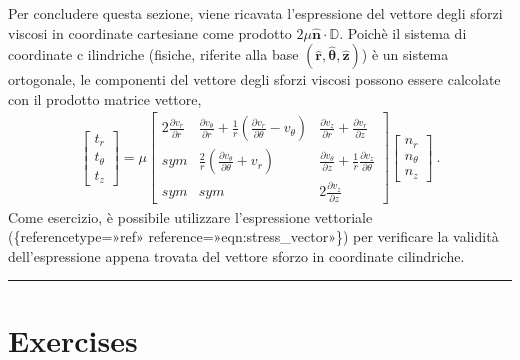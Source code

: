 \documentclass[letterpaper,10pt,italian]{jupyterBook}
\begin{document}
\sphinxAtStartPar
Per concludere questa sezione, viene ricavata l’espressione del vettore
degli sforzi viscosi in coordinate cartesiane come prodotto
\(2 \mu \mathbf{\hat{n}} \cdot \mathbb{D}\). Poichè il sistema di coordinate
c ilindriche (fisiche, riferite alla base
\((\mathbf{\hat{r}},\mathbf{\hat{\theta}},\mathbf{\hat{z}})\)) è un sistema
ortogonale, le componenti del vettore degli sforzi viscosi possono
essere calcolate con il prodotto matrice vettore,
\begin{equation*}
\begin{split}\begin{bmatrix} t_{r} \\ t_{\theta} \\ t_z \end{bmatrix} = \mu
 \begin{bmatrix}
 2 \frac{\partial v_r}{\partial r} & 
 \frac{\partial v_\theta}{\partial r} + \frac{1}{r}\left( \frac{\partial v_r}{\partial \theta}-v_\theta \right) &
 \frac{\partial v_z}{\partial r} + \frac{\partial v_r}{\partial z}   \\
 sym & 
 \frac{2}{r}\left( \frac{\partial v_\theta}{\partial \theta}+v_r \right) & 
 \frac{\partial v_\theta}{\partial z} +  \frac{1}{r}\frac{\partial v_z}{\partial \theta} \\
 sym &
 sym &
 2 \frac{\partial v_z}{\partial z}
\end{bmatrix}
 \begin{bmatrix} n_{r} \\ n_{\theta} \\ n_z \end{bmatrix} \ .\end{split}
\end{equation*}
\sphinxAtStartPar
Come
esercizio, è possibile utilizzare l’espressione vettoriale
(\{reference\sphinxhyphen{}type=»ref»
reference=»eqn:stress\_vector»\}) per verificare la validità
dell’espressione appena trovata del vettore sforzo in coordinate
cilindriche.


\bigskip\hrule\bigskip


\sphinxstepscope


\section{Exercises}
\label{\detokenize{polimi/fluidmechanics-ita/template/capitoli/06_slnEsatte/exercises:exercises}}\label{\detokenize{polimi/fluidmechanics-ita/template/capitoli/06_slnEsatte/exercises:fluid-mechanics-exact-solutions-exercises}}\label{\detokenize{polimi/fluidmechanics-ita/template/capitoli/06_slnEsatte/exercises::doc}}
\sphinxstepscope
\end{document}
